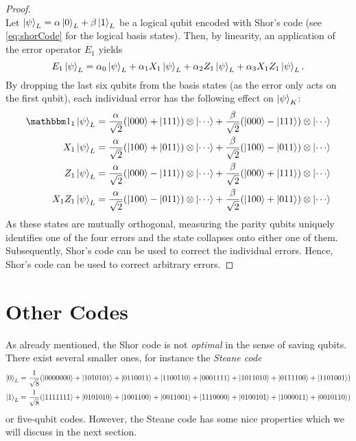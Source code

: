 \begin{proof}
\begin{equation}
				\end{equation}
				Let \( \ket{\psi}_L = \alpha \ket{0}_L + \beta \ket{1}_L \) be a logical qubit encoded with Shor's code (see \eqref{eq:shorCode} for the logical basis states). Then, by linearity, an application of the error operator \(E_1\) yields
				\begin{equation}
					E_1 \ket{\psi}_L = \alpha_0 \ket{\psi}_L + \alpha_1 X_1 \ket{\psi}_L + \alpha_2 Z_1 \ket{\psi}_L + \alpha_3 X_1 Z_1 \ket{\psi}_L.
				\end{equation}
				By dropping the last six qubits from the basis states (as the error only acts on the first qubit), each individual error has the following effect on \( \ket{\psi}_K \):
				\begin{align}
					\ID_1 \ket{\psi}_L   & = \frac{\alpha}{\sqrt{2}} (\ket{000} + \ket{111}) \otimes \ket{\cdots} + \frac{\beta}{\sqrt{2}} (\ket{000} - \ket{111}) \otimes \ket{\cdots} \\
					X_1 \ket{\psi}_L     & = \frac{\alpha}{\sqrt{2}} (\ket{100} + \ket{011}) \otimes \ket{\cdots} + \frac{\beta}{\sqrt{2}} (\ket{100} - \ket{011}) \otimes \ket{\cdots} \\
					Z_1 \ket{\psi}_L     & = \frac{\alpha}{\sqrt{2}} (\ket{000} - \ket{111}) \otimes \ket{\cdots} + \frac{\beta}{\sqrt{2}} (\ket{000} + \ket{111}) \otimes \ket{\cdots} \\
					X_1 Z_1 \ket{\psi}_L & = \frac{\alpha}{\sqrt{2}} (\ket{100} - \ket{011}) \otimes \ket{\cdots} + \frac{\beta}{\sqrt{2}} (\ket{100} + \ket{011}) \otimes \ket{\cdots}
				\end{align}
				As these states are mutually orthogonal, measuring the parity qubits uniquely identifies one of the four errors and the state collapses onto either one of them. Subsequently, Shor's code can be used to correct the individual errors. Hence, Shor's code can be used to correct arbitrary errors.
			\end{proof}

	\section{Other Codes}
		\label{subsec:otherCodes}

		As already mentioned, the Shor code is not \emph{optimal} in the sense of saving qubits. There exist several smaller ones, for instance the \emph{Steane code}
		\begin{align}
			\ket{0}_L & = \frac{1}{\sqrt{8}} (\ket{0000000} + \ket{1010101} + \ket{0110011} + \ket{1100110} + \ket{0001111} + \ket{1011010} + \ket{0111100} + \ket{1101001}) \\
			\ket{1}_L & = \frac{1}{\sqrt{8}} (\ket{1111111} + \ket{0101010} + \ket{1001100} + \ket{0011001} + \ket{1110000} + \ket{0100101} + \ket{1000011} + \ket{0010110})
		\end{align}
		or five-qubit codes. However, the Steane code has some nice properties which we will discuss in the next section.

